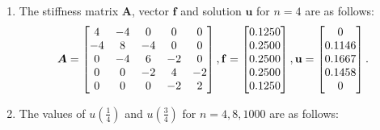 \documentclass[english,onecolumn]{IEEEtran}
\begin{document}
\begin{enumerate}
    \item  The stiffness matrix $\boldsymbol{A}$, vector $\mathbf{f}$ and solution $\mathbf{u}$ for $n = 4$ are as follows:
    \begin{equation}
        \boldsymbol{A} = \begin{bmatrix}
            4   & -4  &   0  &   0  &   0\\
            -4   &  8   & -4  &   0  &   0\\
            0  &  -4  &   6  &  -2  &   0\\
            0  &   0  &  -2   &  4  &  -2\\
            0   &  0  &   0  &  -2  &  2\\
        \end{bmatrix}, \quad
        \\
        \mathbf{f} = \begin{bmatrix}
            0.1250\\
            0.2500\\
            0.2500\\
            0.2500\\
            0.1250\\
        \end{bmatrix}, \quad
        \\
        \mathbf{u} = \begin{bmatrix}
            0\\
            0.1146\\
            0.1667\\
            0.1458\\
            0\\
        \end{bmatrix}.
    \end{equation}
    \item The values of $u(\frac{1}{4})$ and $u(\frac{3}{4})$ for $n = 4, 8, 1000$ are as follows:\\
    

\end{enumerate}
\end{document}
